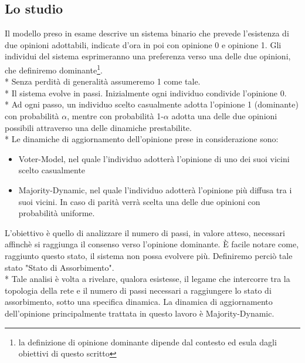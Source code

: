 \documentclass{article}
\begin{document}
\subsection{Lo studio}
Il modello preso in esame descrive un sistema binario che prevede l'esistenza di due opinioni adottabili, indicate d'ora in poi con opinione 0 e opinione 1. Gli individui del sistema esprimeranno una preferenza verso una delle due opinioni, che definiremo  dominante\footnote{la definizione di opinione dominante dipende dal contesto ed esula dagli obiettivi di questo scritto}.\\*
Senza perdità di generalità assumeremo 1 come tale.\\*
Il sistema evolve in passi. Inizialmente ogni individuo condivide l'opinione 0.\\*
Ad ogni passo, un individuo scelto casualmente adotta l'opinione 1 (dominante) con probabilità $\alpha$, mentre con probabilità 1-$\alpha$ adotta una delle due opinioni possibili attraverso una delle dinamiche prestabilite.\\*
Le dinamiche di aggiornamento dell'opinione prese in considerazione sono:
\begin{itemize}
\item Voter-Model, nel quale l'individuo adotterà l'opinione di uno dei suoi vicini scelto casualmente
\item Majority-Dynamic, nel quale l'individuo adotterà l'opinione più diffusa tra i suoi vicini. In caso di parità verrà scelta una delle due opinioni con probabilità uniforme.
\end{itemize}
L'obiettivo è quello di analizzare il numero di passi, in valore atteso, necessari affinchè si raggiunga il consenso verso l'opinione dominante. È facile notare come, raggiunto questo stato, il sistema non possa evolvere più. Definiremo perciò tale stato "Stato di Assorbimento".\\*
Tale analisi è volta a rivelare, qualora esistesse, il legame che intercorre tra la topologia della rete e il numero di passi necessari a raggiungere lo stato di assorbimento, sotto una specifica dinamica.
La dinamica di aggiornamento dell'opinione principalmente trattata in questo lavoro è Majority-Dynamic.
\end{document}
